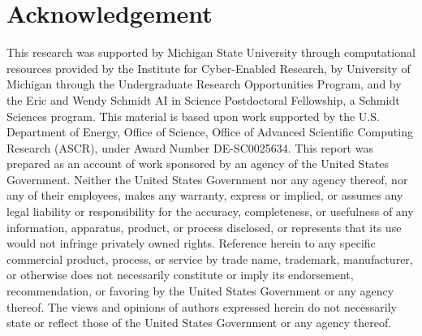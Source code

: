 \section*{Acknowledgement}

{\footnotesize
This research was supported by Michigan State University through computational resources provided by the Institute for Cyber-Enabled Research, by University of Michigan through the Undergraduate Research Opportunities Program, and by the Eric and Wendy Schmidt AI in Science Postdoctoral Fellowship, a Schmidt Sciences program.
This material is based upon work supported by the U.S. Department of Energy, Office of Science, Office of Advanced Scientific Computing Research (ASCR), under Award Number DE-SC0025634.
This report was prepared as an account of work sponsored by an agency of the United States Government.
Neither the United States Government nor any agency thereof, nor any of their employees, makes any warranty, express or implied, or assumes any legal liability or responsibility for the accuracy, completeness, or usefulness of any information, apparatus, product, or process disclosed, or represents that its use would not infringe privately owned rights.
Reference herein to any specific commercial product, process, or service by trade name, trademark, manufacturer, or otherwise does not necessarily constitute or imply its endorsement, recommendation, or favoring by the United States Government or any agency thereof.
The views and opinions of authors expressed herein do not necessarily state or reflect those of the United States Government or any agency thereof.
}
